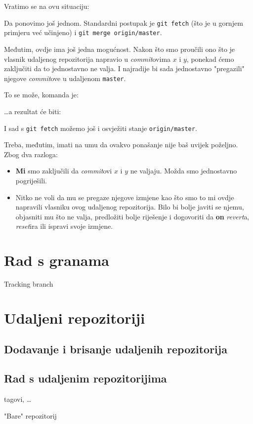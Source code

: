 Vratimo se na ovu situaciju:



Da ponovimo još jednom.
Standardni postupak je \verb+git fetch+ (što je u gornjem primjeru već učinjeno) i \verb+git merge origin/master+.

Međutim, ovdje ima još jedna mogućnost.
Nakon što smo proučili ono što je vlasnik udaljenog repozitorija napravio u \emph{commit}ovima $x$ i $y$, ponekad ćemo zaključiti da to jednostavno ne valja. 
I najradije bi sada jednostavno "pregazili" njegove \emph{commit}ove u udaljenom \verb+master+.

To se može, komanda je:


\dots{}a rezultat će biti:



I sad s \verb+git fetch+ možemo još i osvježiti stanje \verb+origin/master+.

Treba, međutim, imati na umu da ovakvo ponašanje nije baš uvijek poželjno. 
Zbog dva razloga:

\begin{itemize}
	\item \textbf{Mi} smo zaključili da \emph{commit}ovi $x$ i $y$ ne valjaju. Možda smo jednostavno pogriješili.
	\item Nitko ne voli da mu se pregaze njegove izmjene kao što smo to mi ovdje napravili vlasniku ovog udaljenog repozitorija. Bilo bi bolje javiti se njemu, objasniti mu što ne valja, predložiti bolje riješenje i dogovoriti da \textbf{on} \emph{revert}a, \emph{reset}ira ili ispravi svoje izmjene.
\end{itemize}

\section*{Rad s granama}

\TODO Tracking branch

\section*{Udaljeni repozitoriji}

\subsection*{Dodavanje i brisanje udaljenih repozitorija}

\subsection*{Rad s udaljenim repozitorijima}

tagovi, \dots

\TODO "Bare" repozitorij


